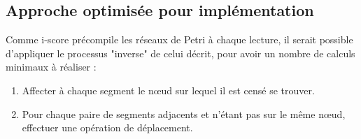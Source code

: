 \subsection{Approche optimisée pour implémentation}
Comme i-score précompile les réseaux de Petri à chaque lecture, il serait possible d'appliquer le processus "inverse" de celui décrit, pour avoir un nombre de calculs minimaux à réaliser : 

\begin{enumerate}
\item Affecter à chaque segment le nœud sur lequel il est censé se trouver.
\item Pour chaque paire de segments adjacents et n'étant pas sur le même nœud, effectuer une opération de déplacement.
\end{enumerate}
